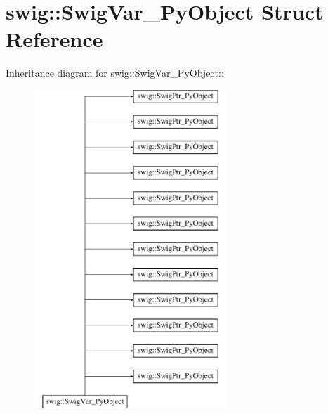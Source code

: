 \hypertarget{structswig_1_1SwigVar__PyObject}{
\section{swig::SwigVar\_\-PyObject Struct Reference}
\label{de/d74/structswig_1_1SwigVar__PyObject}
}
Inheritance diagram for swig::SwigVar\_\-PyObject::\begin{figure}[H]
\begin{center}
\leavevmode
\includegraphics[height=12cm]{de/d74/structswig_1_1SwigVar__PyObject}
\end{center}
\end{figure}
